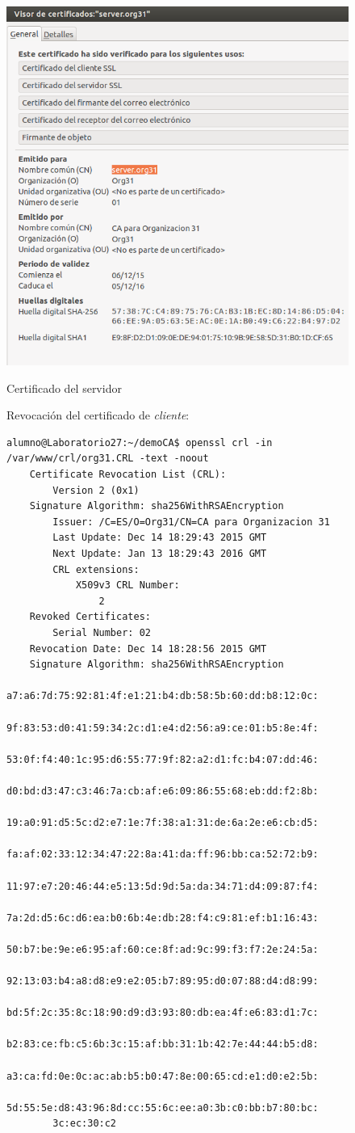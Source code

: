 \documentclass[]{article}
\begin{document}
\begin{figure}[h]
	\caption{Certificado del servidor}
	\centering
	\includegraphics[scale=0.5]{images/certs/servercert1.png}
	\label{fig:servercert1}
\end{figure}

\begin{figure}[h]
	Revocación del certificado de \textit{cliente}:
\begin{Verbatim}[frame=single]
alumno@Laboratorio27:~/demoCA$ openssl crl -in /var/www/crl/org31.CRL -text -noout 
	Certificate Revocation List (CRL):
		Version 2 (0x1)
	Signature Algorithm: sha256WithRSAEncryption
		Issuer: /C=ES/O=Org31/CN=CA para Organizacion 31
		Last Update: Dec 14 18:29:43 2015 GMT
		Next Update: Jan 13 18:29:43 2016 GMT
		CRL extensions:
			X509v3 CRL Number: 
				2
	Revoked Certificates:
		Serial Number: 02
	Revocation Date: Dec 14 18:28:56 2015 GMT
	Signature Algorithm: sha256WithRSAEncryption
		a7:a6:7d:75:92:81:4f:e1:21:b4:db:58:5b:60:dd:b8:12:0c:
		9f:83:53:d0:41:59:34:2c:d1:e4:d2:56:a9:ce:01:b5:8e:4f:
		53:0f:f4:40:1c:95:d6:55:77:9f:82:a2:d1:fc:b4:07:dd:46:
		d0:bd:d3:47:c3:46:7a:cb:af:e6:09:86:55:68:eb:dd:f2:8b:
		19:a0:91:d5:5c:d2:e7:1e:7f:38:a1:31:de:6a:2e:e6:cb:d5:
		fa:af:02:33:12:34:47:22:8a:41:da:ff:96:bb:ca:52:72:b9:
		11:97:e7:20:46:44:e5:13:5d:9d:5a:da:34:71:d4:09:87:f4:
		7a:2d:d5:6c:d6:ea:b0:6b:4e:db:28:f4:c9:81:ef:b1:16:43:
		50:b7:be:9e:e6:95:af:60:ce:8f:ad:9c:99:f3:f7:2e:24:5a:
		92:13:03:b4:a8:d8:e9:e2:05:b7:89:95:d0:07:88:d4:d8:99:
		bd:5f:2c:35:8c:18:90:d9:d3:93:80:db:ea:4f:e6:83:d1:7c:
		b2:83:ce:fb:c5:6b:3c:15:af:bb:31:1b:42:7e:44:44:b5:d8:
		a3:ca:fd:0e:0c:ac:ab:b5:b0:47:8e:00:65:cd:e1:d0:e2:5b:
		5d:55:5e:d8:43:96:8d:cc:55:6c:ee:a0:3b:c0:bb:b7:80:bc:
		3c:ec:30:c2
\end{Verbatim}
\end{figure}
\end{document}
